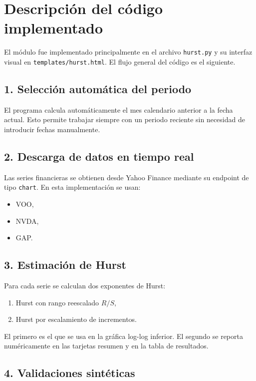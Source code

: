 \documentclass[12pt,a4paper]{article}
\begin{document}
\section{Descripción del código implementado}

El módulo fue implementado principalmente en el archivo \texttt{hurst.py} y su interfaz visual en \texttt{templates/hurst.html}. El flujo general del código es el siguiente.

\subsection{1. Selección automática del periodo}

El programa calcula automáticamente el mes calendario anterior a la fecha actual. Esto permite trabajar siempre con un periodo reciente sin necesidad de introducir fechas manualmente.

\subsection{2. Descarga de datos en tiempo real}

Las series financieras se obtienen desde Yahoo Finance mediante su endpoint de tipo \texttt{chart}. En esta implementación se usan:

\begin{itemize}
    \item VOO,
    \item NVDA,
    \item GAP.
\end{itemize}

\subsection{3. Estimación de Hurst}

Para cada serie se calculan dos exponentes de Hurst:

\begin{enumerate}
    \item Hurst con rango reescalado \(R/S\),
    \item Hurst por escalamiento de incrementos.
\end{enumerate}

El primero es el que se usa en la gráfica log-log inferior. El segundo se reporta numéricamente en las tarjetas resumen y en la tabla de resultados.

\subsection{4. Validaciones sintéticas}
\end{document}
